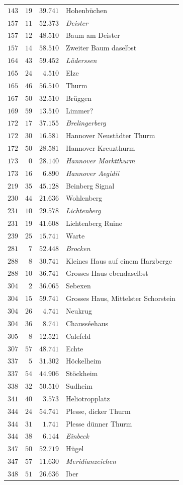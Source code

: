 \begin{longtable}{@{}rrrp{.61\linewidth}@{}}
\(143\)&\(19\)&\(39.741\)&\raggedright Hohenbüchen\tabularnewline
\(157\)&\(11\)&\(52.373\)&\raggedright \textit{Deister}\tabularnewline
\(157\)&\(12\)&\(48.510\)&\raggedright Baum am Deister\tabularnewline
\(157\)&\(14\)&\(58.510\)&\raggedright Zweiter Baum daselbst\tabularnewline
\(164\)&\(43\)&\(59.452\)&\raggedright \textit{Lüderssen}\tabularnewline
\(165\)&\(24\)&\(4.510\)&\raggedright Elze\tabularnewline
\(165\)&\(46\)&\(56.510\)&\raggedright Thurm\tabularnewline
\(167\)&\(50\)&\(32.510\)&\raggedright Brüggen\tabularnewline
\(169\)&\(59\)&\(13.510\)&\raggedright Limmer?\tabularnewline
\(172\)&\(17\)&\(37.155\)&\raggedright \textit{Brelingerberg}\tabularnewline
\(172\)&\(30\)&\(16.581\)&\raggedright Hannover Neustädter Thurm\tabularnewline
\(172\)&\(50\)&\(28.581\)&\raggedright Hannover Kreuzthurm\tabularnewline
\(173\)&\(0\)&\(28.140\)&\raggedright \textit{Hannover Marktthurm}\tabularnewline
\(173\)&\(16\)&\(6.890\)&\raggedright \textit{Hannover Aegidii}\tabularnewline
\(219\)&\(35\)&\(45.128\)&\raggedright Beinberg Signal\tabularnewline
\(230\)&\(44\)&\(21.636\)&\raggedright Wohlenberg\tabularnewline
\(231\)&\(10\)&\(29.578\)&\raggedright \textit{Lichtenberg}\tabularnewline
\(231\)&\(19\)&\(41.608\)&\raggedright Lichtenberg Ruine\tabularnewline
\(239\)&\(25\)&\(15.741\)&\raggedright Warte\tabularnewline
\(281\)&\(7\)&\(52.448\)&\raggedright \textit{Brocken}\tabularnewline
\(288\)&\(8\)&\(30.741\)&\raggedright Kleines Haus auf einem Harzberge\tabularnewline
\(288\)&\(10\)&\(36.741\)&\raggedright Grosses Haus ebendaselbst\tabularnewline
\(304\)&\(2\)&\(36.065\)&\raggedright Sebexen\tabularnewline
\(304\)&\(15\)&\(59.741\)&\raggedright Grosses Haus, Mittelster Schorstein\tabularnewline
\(304\)&\(26\)&\(4.741\)&\raggedright Neukrug\tabularnewline
\(304\)&\(36\)&\(8.741\)&\raggedright Chausséehaus\tabularnewline
\(305\)&\(8\)&\(12.521\)&\raggedright Calefeld\tabularnewline
\(307\)&\(57\)&\(48.741\)&\raggedright Echte\tabularnewline
\(337\)&\(5\)&\(31.302\)&\raggedright Höckelheim\tabularnewline
\(337\)&\(54\)&\(44.906\)&\raggedright Stöckheim\tabularnewline
\(338\)&\(32\)&\(50.510\)&\raggedright Sudheim\tabularnewline
\(341\)&\(40\)&\(3.573\)&\raggedright Heliotropplatz\tabularnewline
\(344\)&\(24\)&\(54.741\)&\raggedright Plesse, dicker Thurm\tabularnewline
\(344\)&\(31\)&\(1.741\)&\raggedright Plesse dünner Thurm\tabularnewline
\(344\)&\(38\)&\(6.144\)&\raggedright \textit{Einbeck}\tabularnewline
\(347\)&\(50\)&\(52.719\)&\raggedright Hügel\tabularnewline
\(347\)&\(57\)&\(11.630\)&\raggedright \textit{Meridianzeichen}\tabularnewline
\(348\)&\(51\)&\(26.636\)&\raggedright Iber\tabularnewline

\end{longtable}
